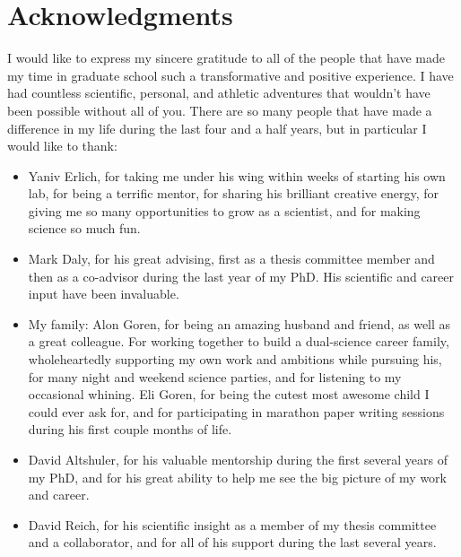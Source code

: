 \section*{Acknowledgments}

I would like to express my sincere gratitude to all of the people that have made my time in graduate school such a transformative and positive experience. I have had countless scientific, personal, and athletic adventures that wouldn't have been possible without all of you. There are so many people that have made a difference in my life during the last four and a half years, but in particular I would like to thank: 

\begin{itemize}

\item Yaniv Erlich, for taking me under his wing within weeks of starting his own lab, for being a terrific mentor, for sharing his brilliant creative energy, for giving me so many opportunities to grow as a scientist, and for making science so much fun.

\item Mark Daly, for his great advising, first as a thesis committee member and then as a co-advisor during the last year of my PhD. His scientific and career input have been invaluable.

\item My family: Alon Goren, for being an amazing husband and friend, as well as a great colleague. For working together to build a dual-science career family, wholeheartedly supporting my own work and ambitions while pursuing his, for many night and weekend science parties, and for listening to my occasional whining. Eli Goren, for being the cutest most awesome child I could ever ask for, and for participating in marathon paper writing sessions during his first couple months of life.

\item David Altshuler, for his valuable mentorship during the first several years of my PhD, and for his great ability to help me see the big picture of my work and career.

\item David Reich, for his scientific insight as a member of my thesis committee and a collaborator, and for all of his support during the last several years.


\end{itemize}
